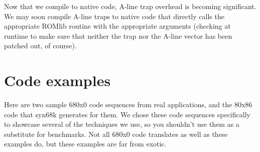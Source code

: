 Now that we compile to native code, A-line trap overhead is becoming
significant.  We may soon compile A-line traps to native code that
directly calls the appropriate ROMlib routine with the appropriate
arguments (checking at runtime to make sure that neither the trap
nor the A-line vector has been patched out, of course).

\section{Code examples}

Here are two sample 680x0 code sequences from real applications,
and the 80x86 code that syn68k generates for them.  We chose these
code sequences specifically to showcase several of the techniques
we use, so you shouldn't use them as a substitute for benchmarks.
Not all 680x0 code translates as well as these examples do, but
these examples are far from exotic.

